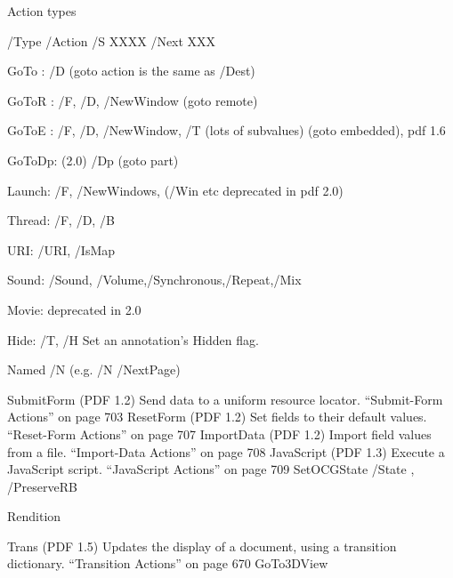                
Action types 

/Type /Action /S XXXX /Next XXX 

GoTo  : /D  (goto action is the same as /Dest)

GoToR : /F, /D, /NewWindow (goto remote)

GoToE : /F, /D, /NewWindow, /T (lots of subvalues) (goto embedded), pdf 1.6

GoToDp: (2.0) /Dp (goto part)

Launch:  /F, /NewWindows, (/Win etc deprecated in pdf 2.0)

Thread: /F, /D, /B

URI: /URI, /IsMap


Sound: /Sound, /Volume,/Synchronous,/Repeat,/Mix

Movie: deprecated in 2.0

Hide: /T, /H
 Set an annotation’s Hidden flag. 

Named /N (e.g. /N /NextPage)

SubmitForm
(PDF 1.2) Send data to a uniform resource locator.
“Submit-Form Actions” on page 703
ResetForm
(PDF 1.2) Set fields to their default values.
“Reset-Form Actions” on page 707
ImportData
(PDF 1.2) Import field values from a file.
“Import-Data Actions” on page 708
JavaScript
(PDF 1.3) Execute a JavaScript script.
“JavaScript Actions” on page 709
SetOCGState /State , /PreserveRB

Rendition

Trans
(PDF 1.5) Updates the display of a document, using a transition dictionary.
“Transition Actions” on page 670
GoTo3DView               
